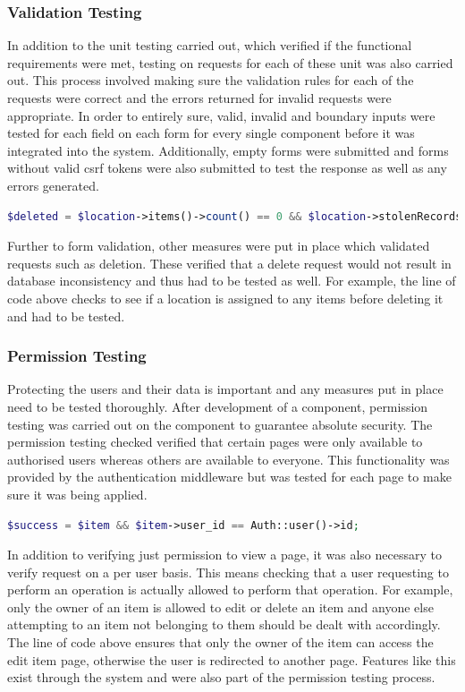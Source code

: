 \subsubsection{Validation Testing}

In addition to the unit testing carried out, which verified if the functional requirements were met, testing on requests for each of these unit was also carried out. This process involved making sure the validation rules for each of the requests were correct and the errors returned for invalid requests were appropriate. In order to entirely sure, valid, invalid and boundary inputs were tested for each field on each form for every single component before it was integrated into the system. Additionally, empty forms were submitted and forms without valid csrf tokens were also submitted to test the response as well as any errors generated.

\begin{lstlisting}[language=php]
	$deleted = $location->items()->count() == 0 && $location->stolenRecords()->count() == 0 && $location->delete();
\end{lstlisting}

Further to form validation, other measures were put in place which validated requests such as deletion. These verified that a delete request would not result in database inconsistency and thus had to be tested as well. For example, the line of code above checks to see if a location is assigned to any items before deleting it and had to be tested.

\subsubsection{Permission Testing}
Protecting the users and their data is important and any measures put in place need to be tested thoroughly. After development of a component, permission testing was carried out on the component to guarantee absolute security. The permission testing checked verified that certain pages were only available to authorised users whereas others are available to everyone. This functionality was provided by the authentication middleware but was tested for each page to make sure it was being applied.

\begin{lstlisting}[language=php]	
	$success = $item && $item->user_id == Auth::user()->id;
\end{lstlisting}

In addition to verifying just permission to view a page, it was also necessary to verify request on a per user basis. This means checking that a user requesting to perform an operation is actually allowed to perform that operation. For example, only the owner of an item is allowed to edit or delete an item and anyone else attempting to an item not belonging to them should be dealt with accordingly. The line of code above ensures that only the owner of the item can access the edit item page, otherwise the user is redirected to another page. Features like this exist through the system and were also part of the permission testing process.

